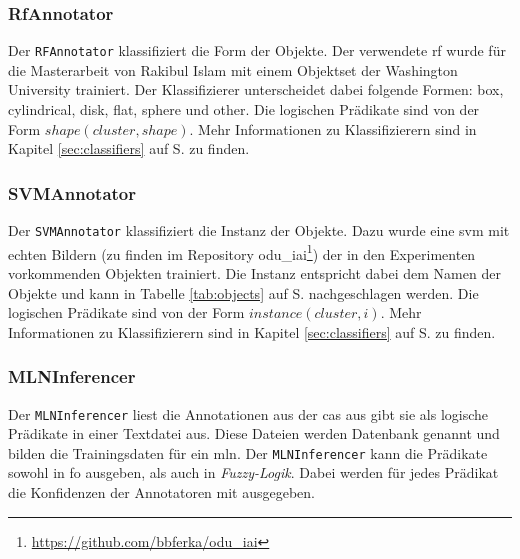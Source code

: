\subsubsection{RfAnnotator}
Der \texttt{RFAnnotator} klassifiziert die Form der Objekte. Der verwendete \gls{rf} wurde für die Masterarbeit von Rakibul Islam \cite{rakib} mit einem Objektset der Washington University trainiert. Der Klassifizierer unterscheidet dabei folgende Formen: box, cylindrical, disk, flat, sphere und other. Die logischen Prädikate sind von der Form  $shape(cluster, shape)$. Mehr Informationen zu Klassifizierern sind in Kapitel \ref{sec:classifiers} auf S. \pageref{sec:classifiers} zu finden.

\subsubsection{SVMAnnotator}
Der \texttt{SVMAnnotator} klassifiziert die Instanz der Objekte. Dazu wurde eine \gls{svm} mit echten Bildern (zu finden im Repository odu\_iai\footnote{\url{https://github.com/bbferka/odu\_iai}}) der in den Experimenten vorkommenden Objekten trainiert. Die Instanz entspricht dabei dem Namen der Objekte und kann in Tabelle \ref{tab:objects} auf S.\pageref{tab:objects} nachgeschlagen werden. Die logischen Prädikate sind von der Form  $instance(cluster, i)$. Mehr Informationen zu Klassifizierern sind in Kapitel \ref{sec:classifiers} auf S. \pageref{sec:classifiers} zu finden.

\subsubsection{MLNInferencer}
\label{sec:mlnInferencer}
Der \texttt{MLNInferencer} liest die Annotationen aus der \gls{cas} aus gibt sie als logische Prädikate in einer Textdatei aus. Diese Dateien werden Datenbank genannt und bilden die Trainingsdaten für ein \gls{mln}. Der \texttt{MLNInferencer} kann die Prädikate sowohl in \gls{fo} ausgeben, als auch in \textit{Fuzzy-Logik}. Dabei werden für jedes Prädikat die Konfidenzen der Annotatoren mit ausgegeben.




